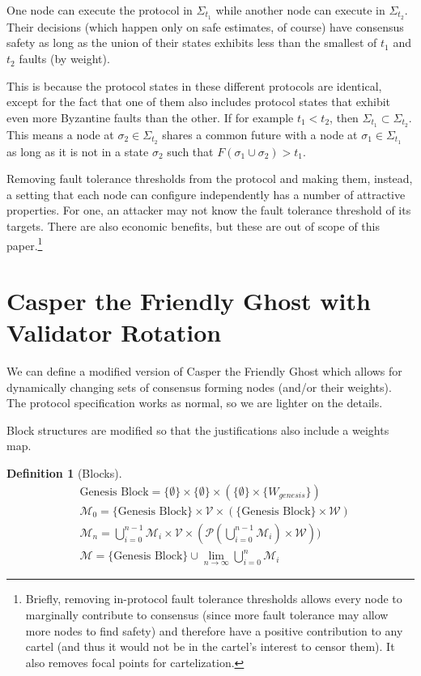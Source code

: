 \documentclass{article}
\theoremstyle{definition}
\newtheorem{defn}{Definition}[section]
\begin{document}
One node can execute the protocol in $\Sigma_{t_1}$ while another node can execute in $\Sigma_{t_2}$. Their decisions (which happen only on safe estimates, of course) have consensus safety as long as the union of their states exhibits less than the smallest of $t_1$ and $t_2$ faults (by weight).

This is because the protocol states in these different protocols are identical, except for the fact that one of them also includes protocol states that exhibit even more Byzantine faults than the other. If for example $t_1 < t_2$, then $\Sigma_{t_1} \subset \Sigma_{t_2}$. This means a node at $\sigma_2 \in \Sigma_{t_2}$ shares a common future with a node at $\sigma_1 \in \Sigma_{t_1}$ as long as it is not in a state $\sigma_2$ such that $F(\sigma_1 \cup \sigma_2) > t_1$.

Removing fault tolerance thresholds from the protocol and making them, instead, a setting that each node can configure independently has a number of attractive properties. For one, an attacker may not know the fault tolerance threshold of its targets. There are also economic benefits, but these are out of scope of this paper.\footnote{Briefly, removing in-protocol fault tolerance thresholds allows every node to marginally contribute to consensus (since more fault tolerance may allow more nodes to find safety) and therefore have a positive contribution to any cartel (and thus it would not be in the cartel's interest to censor them). It also removes focal points for cartelization.}

\section{Casper the Friendly Ghost with Validator Rotation}

We can define a modified version of Casper the Friendly Ghost which allows for dynamically changing sets of consensus forming nodes (and/or their weights). The protocol specification works as normal, so we are lighter on the details.

Block structures are modified so that the justifications also include a weights map.

\begin{defn}[Blocks]
\begin{equation*}
\begin{split}
  &\text{Genesis Block} = \{\emptyset\} \times \{\emptyset\} \times (\{\emptyset\} \times \{W_{genesis}\})\\
    &\mathcal{M}_0 = \{\text{Genesis Block}\} \times \mathcal{V} \times (\{\text{Genesis Block}\} \times \mathcal{W})\\
    &\mathcal{M}_n = \bigcup_{i=0}^{n-1} \mathcal{M}_i \times \mathcal{V} \times (\mathcal{P}(\bigcup_{i=0}^{n-1} \mathcal{M}_i) \times \mathcal{W}))\\
    &\mathcal{M} = \{\text{Genesis Block}\} \cup \lim_{n \to \infty} \bigcup_{i=0}^{n} \mathcal{M}_i
\end{split}
\end{equation*}
\end{defn}
\end{document}
